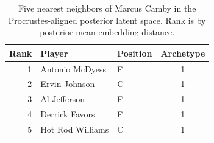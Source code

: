 \begin{table}[htbp]
  \centering\small
  \begin{tabular}{rllc}
    \toprule
    Rank & Player & Position & Archetype \\
    \midrule
    1 & Antonio McDyess & F & 1 \\
    2 & Ervin Johnson & C & 1 \\
    3 & Al Jefferson & F & 1 \\
    4 & Derrick Favors & F & 1 \\
    5 & Hot Rod Williams & C & 1 \\
    \bottomrule
  \end{tabular}
  \caption{Five nearest neighbors of Marcus Camby in the Procrustes-aligned posterior latent space. Rank is by posterior mean embedding distance.}
  \label{tab:Marcus_Camby_neighbors}
\end{table}

